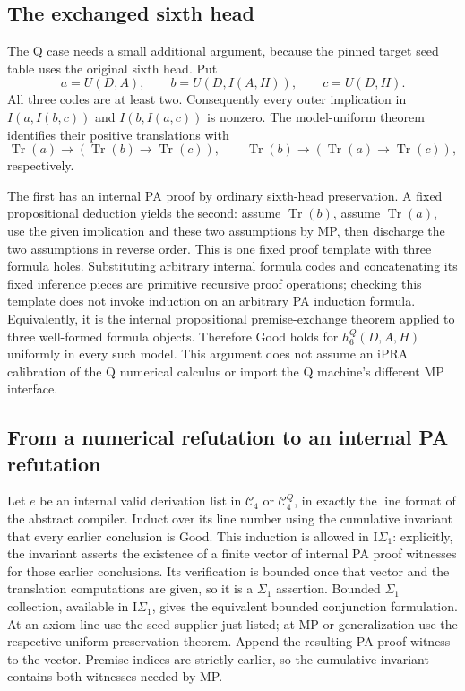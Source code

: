 \subsection{The exchanged sixth head}

The Q case needs a small additional argument, because the pinned target
seed table uses the original sixth head.  Put
\[
 a=U(D,A),\qquad b=U(D,I(A,H)),\qquad c=U(D,H).
\]
All three codes are at least two.  Consequently every outer implication
in $I(a,I(b,c))$ and $I(b,I(a,c))$ is nonzero.
The model-uniform  theorem identifies their
positive translations with
\[
 \operatorname{Tr}(a)\to
      (\operatorname{Tr}(b)\to\operatorname{Tr}(c)),
 \qquad
 \operatorname{Tr}(b)\to
      (\operatorname{Tr}(a)\to\operatorname{Tr}(c)),
\]
respectively\cite{reverse-mp}.

The first has an internal PA proof by ordinary sixth-head preservation.
A fixed propositional deduction yields the second: assume
$\operatorname{Tr}(b)$, assume $\operatorname{Tr}(a)$, use the given
implication and these two assumptions by MP, then discharge the two
assumptions in reverse order.  This is one fixed proof template with
three formula holes.  Substituting arbitrary internal formula codes and
concatenating its fixed inference pieces are primitive recursive proof
operations; checking this template does not invoke induction on an
arbitrary PA induction formula.  Equivalently, it is the internal
propositional premise-exchange theorem applied to three well-formed
formula objects.  Therefore Good holds for $h_6^Q(D,A,H)$ uniformly
in every such model.  This argument does not assume an iPRA calibration
of the Q numerical calculus or import the Q machine's different MP
interface.

\subsection{From a numerical refutation to an internal PA refutation}

Let $e$ be an internal valid derivation list in $\mathcal C_4$ or
$\mathcal C_4^Q$, in exactly the line format of the abstract compiler.
Induct over its line number using the cumulative invariant that every
earlier conclusion is Good.  This induction is allowed in
$\mathrm I\Sigma_1$: explicitly, the invariant asserts the existence
of a finite vector of internal PA proof witnesses for those earlier
conclusions.  Its verification is bounded once that vector and the
translation computations are given, so it is a $\Sigma_1$ assertion.
Bounded $\Sigma_1$ collection, available in $\mathrm I\Sigma_1$, gives
the equivalent bounded conjunction formulation.  At an axiom line use
the seed supplier just listed; at MP or generalization use the respective
uniform preservation theorem.  Append the resulting PA proof witness to
the vector.  Premise indices are strictly earlier, so the cumulative
invariant contains both witnesses needed by MP.

